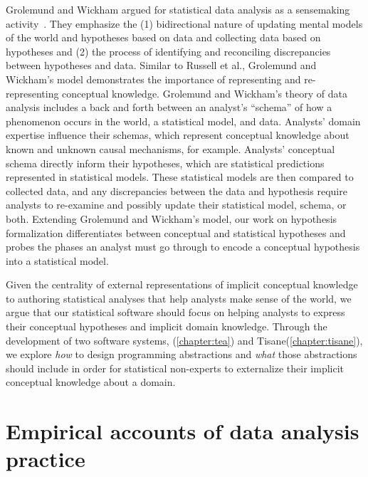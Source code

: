 Grolemund and Wickham argued for statistical data analysis as a sensemaking
activity~\cite{grolemund2014cognitive}. They emphasize the (1) bidirectional
nature of updating mental models of the world and hypotheses based on data and
collecting data based on hypotheses and (2) the process of identifying and
reconciling discrepancies between hypotheses and data. Similar to Russell et
al., Grolemund and Wickham's model demonstrates the importance of representing
and re-representing conceptual knowledge. Grolemund and Wickham's theory of data
analysis includes a back and forth between an analyst's ``schema'' of how a
phenomenon occurs in the world, a statistical model, and data. Analysts' domain
expertise influence their schemas, which represent conceptual knowledge about
known and unknown causal mechanisms, for example. Analysts' conceptual schema
directly inform their hypotheses, which are statistical predictions represented
in statistical models. These statistical models are then compared to collected
data, and any discrepancies between the data and hypothesis require analysts to
re-examine and possibly update their statistical model, schema, or both.
Extending Grolemund and Wickham's model, our work on hypothesis formalization
differentiates between conceptual and statistical hypotheses and probes the
phases an analyst must go through to encode a conceptual hypothesis into a
statistical model.

Given the centrality of external representations of implicit conceptual
knowledge to authoring statistical analyses that help analysts make sense of
the world, we argue that our statistical software should focus on helping
analysts to express their conceptual hypotheses and implicit domain knowledge.
Through the development of two software systems, \tea (\autoref{chapter:tea})
and Tisane(\autoref{chapter:tisane}), we explore \textit{how} to design
programming abstractions and \textit{what} those abstractions should include in
order for statistical non-experts to externalize their implicit conceptual
knowledge about a domain. 

\section{Empirical accounts of data analysis practice}

